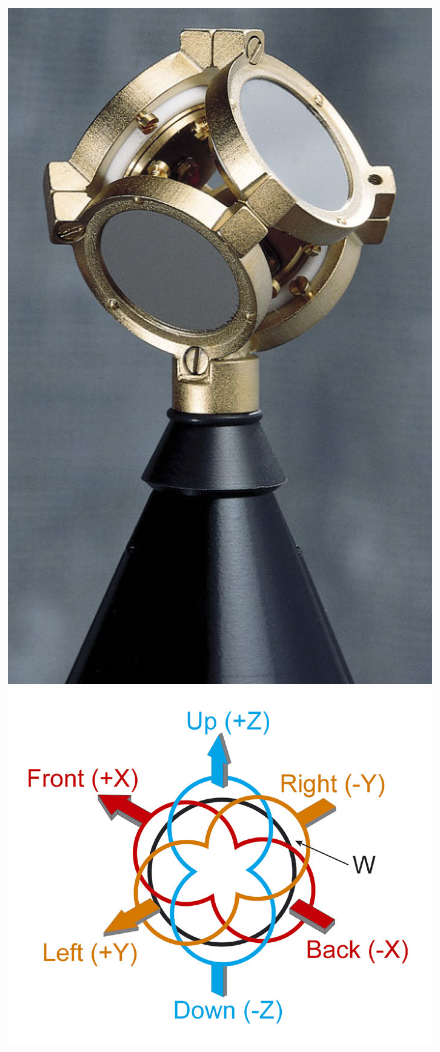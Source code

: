 \documentclass[../../main.tex]{subfiles}
\begin{document}
			\begin{figure}[ht]
				\begin{minipage}{0.5\textwidth}
					\center\includegraphics[scale = 0.2]{Sections/Background/images/soudFieldMic.jpg}
				\end{minipage}
				\begin{minipage}{0.5\textwidth}
					\center\includegraphics[scale = 0.3]{Sections/Background/images/soundFieldPolar.jpg}

\end{minipage}
\end{figure}
\end{document}
